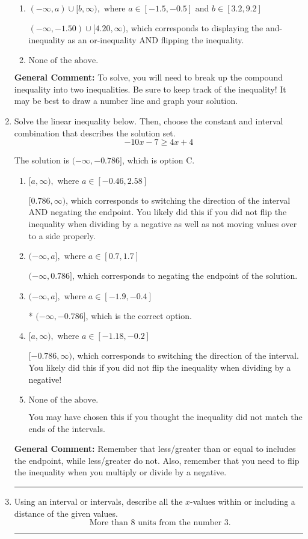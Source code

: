 \documentclass{extbook}[14pt]
\newcommand{\litem}[1]{\item #1

\rule{\textwidth}{0.4pt}}
\begin{document}
\begin{enumerate}
{\begin{enumerate}[label=\Alph*.]
$(-1.50, 4.20]$, which corresponds to flipping the inequality.
\item \( (-\infty, a) \cup [b, \infty), \text{ where } a \in [-1.5, -0.5] \text{ and } b \in [3.2, 9.2] \)

$(-\infty, -1.50) \cup [4.20, \infty)$, which corresponds to displaying the and-inequality as an or-inequality AND flipping the inequality.
\item \( \text{None of the above.} \)


\end{enumerate}

\textbf{General Comment:} To solve, you will need to break up the compound inequality into two inequalities. Be sure to keep track of the inequality! It may be best to draw a number line and graph your solution.
}
\litem{
Solve the linear inequality below. Then, choose the constant and interval combination that describes the solution set.
\[ -10x -7 \geq 4x + 4 \]

The solution is \( (-\infty, -0.786] \), which is option C.\begin{enumerate}[label=\Alph*.]
\item \( [a, \infty), \text{ where } a \in [-0.46, 2.58] \)

 $[0.786, \infty)$, which corresponds to switching the direction of the interval AND negating the endpoint. You likely did this if you did not flip the inequality when dividing by a negative as well as not moving values over to a side properly.
\item \( (-\infty, a], \text{ where } a \in [0.7, 1.7] \)

 $(-\infty, 0.786]$, which corresponds to negating the endpoint of the solution.
\item \( (-\infty, a], \text{ where } a \in [-1.9, -0.4] \)

* $(-\infty, -0.786]$, which is the correct option.
\item \( [a, \infty), \text{ where } a \in [-1.18, -0.2] \)

 $[-0.786, \infty)$, which corresponds to switching the direction of the interval. You likely did this if you did not flip the inequality when dividing by a negative!
\item \( \text{None of the above}. \)

You may have chosen this if you thought the inequality did not match the ends of the intervals.
\end{enumerate}

\textbf{General Comment:} Remember that less/greater than or equal to includes the endpoint, while less/greater do not. Also, remember that you need to flip the inequality when you multiply or divide by a negative.
}
\litem{
Using an interval or intervals, describe all the $x$-values within or including a distance of the given values.
\[ \text{ More than } 8 \text{ units from the number } 3. \]

}
\end{enumerate}
\end{document}
